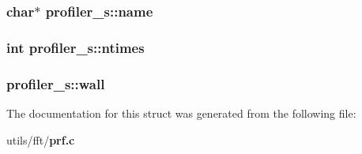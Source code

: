 \subsubsection{\setlength{\rightskip}{0pt plus 5cm}char$\ast$ {\bf profiler\_\-s::name}}\label{structprofiler__s_8c2998a269995141102af510ecc24d54}


\subsubsection{\setlength{\rightskip}{0pt plus 5cm}int {\bf profiler\_\-s::ntimes}}\label{structprofiler__s_8d8a43e86608d1c00ca6785e1122c487}


\subsubsection{ {\bf profiler\_\-s::wall}}\label{structprofiler__s_f26a35d018917ab1c11e54b453b43b78}




The documentation for this struct was generated from the following file:\begin{CompactItemize}
\item 
utils/fft/{\bf prf.c}\end{CompactItemize}
